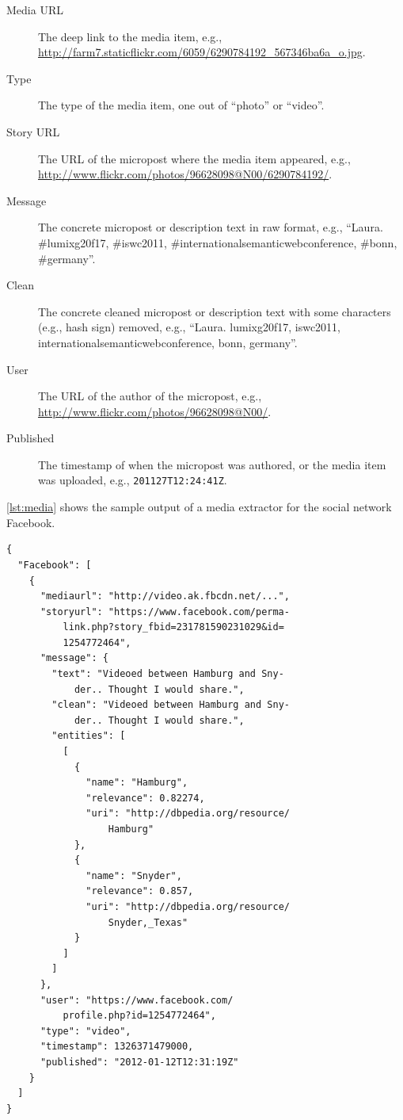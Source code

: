 \documentclass{acm_proc_article-sp}
\newcommand{\inlinelistingsize}{\fontsize{8pt}{11pt}}
\let\oldurl\url
\renewcommand{\url}[1]{\inlinelistingsize\oldurl{#1}}
\begin{document}
\begin{description}
  \item[Media URL] The deep link to the media item, e.g., \url{http://farm7.staticflickr.com/6059/6290784192_567346ba6a_o.jpg}.
  \item[Type] The type of the media item, one out of ``photo'' or ``video''.
  \item[Story URL] The URL of the micropost where the media item appeared, e.g., \url{http://www.flickr.com/photos/96628098@N00/6290784192/}.
  \item[Message] The concrete micropost or description text in raw format, e.g., ``Laura. \#lumixg20f17, \#iswc2011, \#internationalsemanticwebconference, \#bonn, \#germany''.
  \item[Clean] The concrete cleaned micropost or description text with some characters (e.g., hash sign) removed, e.g., ``Laura. lumixg20f17, iswc2011, internationalsemanticwebconference, bonn, germany''.
  \item[User] The URL of the author of the micropost, e.g., \url{http://www.flickr.com/photos/96628098@N00/}.
  \item[Published] The timestamp of when the micropost was authored, or the media item was uploaded, e.g., \texttt{2011\-27T12:24:41Z}.
\end{description}

\autoref{lst:media} shows the sample output of a media extractor for the social network Facebook.

\begin{lstlisting}[caption={Sample output of the media extractor showing a Facebook post processed with named entity extraction and disambiguation (slightly edited for legibility).},label={lst:media}]
{
  "Facebook": [
    {
      "mediaurl": "http://video.ak.fbcdn.net/...",
      "storyurl": "https://www.facebook.com/perma-
          link.php?story_fbid=231781590231029&id=
          1254772464",
      "message": {
        "text": "Videoed between Hamburg and Sny-
            der.. Thought I would share.",
        "clean": "Videoed between Hamburg and Sny-
            der.. Thought I would share.",
        "entities": [
          [
            {
              "name": "Hamburg",
              "relevance": 0.82274,
              "uri": "http://dbpedia.org/resource/
                  Hamburg"
            },
            {
              "name": "Snyder",
              "relevance": 0.857,
              "uri": "http://dbpedia.org/resource/
                  Snyder,_Texas"
            }
          ]
        ]
      },
      "user": "https://www.facebook.com/
          profile.php?id=1254772464",
      "type": "video",
      "timestamp": 1326371479000,
      "published": "2012-01-12T12:31:19Z"
    }
  ]
}
\end{lstlisting}
\end{document}
